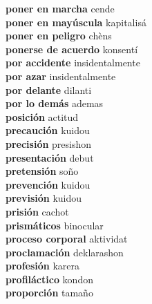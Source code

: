 \textbf{ poner en marcha  } cende \\
\textbf{ poner en mayúscula  } kapitalisá \\
\textbf{ poner en peligro  } chèns \\
\textbf{ ponerse de acuerdo  } konsentí \\
\textbf{ por accidente  } insidentalmente \\
\textbf{ por azar  } insidentalmente \\
\textbf{ por delante  } dilanti \\
\textbf{ por lo demás  } ademas \\
\textbf{ posición  } actitud \\
\textbf{ precaución  } kuidou \\
\textbf{ precisión  } presishon \\
\textbf{ presentación  } debut \\
\textbf{ pretensión  } soño \\
\textbf{ prevención  } kuidou \\
\textbf{ previsión  } kuidou \\
\textbf{ prisión  } cachot \\
\textbf{ prismáticos  } binocular \\
\textbf{ proceso corporal  } aktividat \\
\textbf{ proclamación  } deklarashon \\
\textbf{ profesión  } karera \\
\textbf{ profiláctico  } kondon \\
\textbf{ proporción  } tamaño \\

